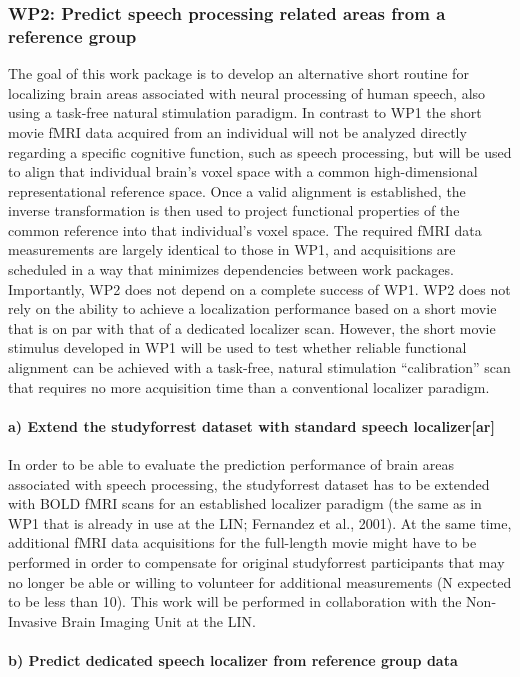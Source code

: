 \subsubsection{WP2: Predict speech processing related areas from a reference
group}
%
The goal of this work package is to develop an alternative short routine for
localizing brain areas associated with neural processing of human speech, also
using a task-free natural stimulation paradigm. In contrast to WP1 the short
movie fMRI data acquired from an individual will not be analyzed directly
regarding a specific cognitive function, such as speech processing, but will be
used to align that individual brain’s voxel space with a common high-dimensional
representational reference space. Once a valid alignment is established, the
inverse transformation is then used to project functional properties of the
common reference into that individual’s voxel space. The required fMRI data
measurements are largely identical to those in WP1, and acquisitions are
scheduled in a way that minimizes dependencies between work packages.
Importantly, WP2 does not depend on a complete success of WP1. WP2 does not rely
on the ability to achieve a localization performance based on a short movie that
is on par with that of a dedicated localizer scan. However, the short movie
stimulus developed in WP1 will be used to test whether reliable functional
alignment can be achieved with a task-free, natural stimulation “calibration”
scan that requires no more acquisition time than a conventional localizer
paradigm.


\paragraph{a) Extend the studyforrest dataset with standard speech
localizer[ar]}
%
In order to be able to evaluate the prediction performance of
brain areas associated with speech processing, the studyforrest dataset has to
be extended with BOLD fMRI scans for an established localizer paradigm (the same
as in WP1 that is already in use at the LIN; Fernandez et al., 2001). At the
same time, additional fMRI data acquisitions for the full-length movie might
have to be performed in order to compensate for original studyforrest
participants that may no longer be able or willing to volunteer for additional
measurements (N expected to be less than 10). This work will be performed in
collaboration with the Non-Invasive Brain Imaging Unit at the LIN.


\paragraph{b) Predict dedicated speech localizer from reference group data}

